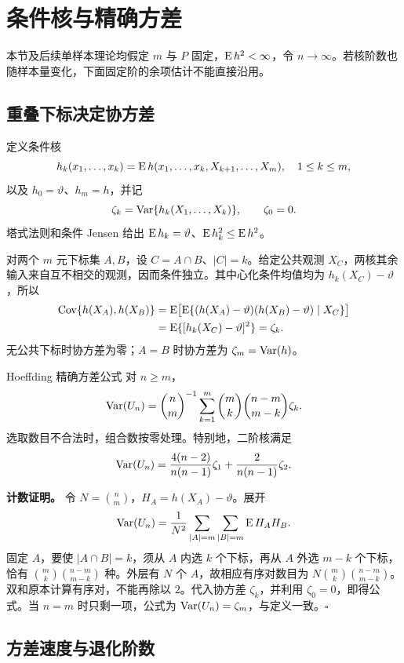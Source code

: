 \section{条件核与精确方差}

本节及后续单样本理论均假定 $m$ 与 $P$ 固定，$\operatorname{E} h^2<\infty$，令 $n\to\infty$。若核阶数也随样本量变化，下面固定阶的余项估计不能直接沿用。

\subsection{重叠下标决定协方差}

定义条件核
\[
 h_k(x_1,\ldots,x_k)
 =\operatorname{E} h(x_1,\ldots,x_k,X_{k+1},\ldots,X_m),
 \quad 1\leq k\leq m,
\]
以及 $h_0=\vartheta$、$h_m=h$，并记
\[
 \zeta_k=\operatorname{Var}\{h_k(X_1,\ldots,X_k)\},\qquad\zeta_0=0.
\]
塔式法则和条件 Jensen 给出 $\operatorname{E} h_k=\vartheta$、$\operatorname{E} h_k^2\leq\operatorname{E} h^2$。

对两个 $m$ 元下标集 $A,B$，设 $C=A\cap B$、$|C|=k$。给定公共观测 $X_C$，两核其余输入来自互不相交的观测，因而条件独立。其中心化条件均值均为 $h_k(X_C)-\vartheta$，所以
\begin{align*}
 \operatorname{Cov}\{h(X_A),h(X_B)\}
 &=\operatorname{E}\bigl[\operatorname{E}\{(h(X_A)-\vartheta)
          (h(X_B)-\vartheta)\mid X_C\}\bigr]\\
 &=\operatorname{E}\{[h_k(X_C)-\vartheta]^2\}=\zeta_k.
\end{align*}
无公共下标时协方差为零；$A=B$ 时协方差为 $\zeta_m=\operatorname{Var}(h)$。

\begin{definitionbox}{Hoeffding 精确方差公式}
对 $n\geq m$，
\begin{equation}
 \operatorname{Var}(U_n)=\binom nm^{-1}
 \sum_{k=1}^m\binom mk\binom{n-m}{m-k}\zeta_k.
 \label{eq:ch4-exact-variance}
\end{equation}
选取数目不合法时，组合数按零处理。特别地，二阶核满足
\[
 \operatorname{Var}(U_n)=\frac{4(n-2)}{n(n-1)}\zeta_1
          +\frac2{n(n-1)}\zeta_2.
\]
\end{definitionbox}

\textbf{计数证明。} 令 $N=\binom nm$，$H_A=h(X_A)-\vartheta$。展开
\[
 \operatorname{Var}(U_n)=\frac1{N^2}\sum_{|A|=m}\sum_{|B|=m}\operatorname{E} H_AH_B.
\]
固定 $A$，要使 $|A\cap B|=k$，须从 $A$ 内选 $k$ 个下标，再从 $A$ 外选 $m-k$ 个下标，恰有 $\binom mk\binom{n-m}{m-k}$ 种。外层有 $N$ 个 $A$，故相应有序对数目为 $N\binom mk\binom{n-m}{m-k}$。双和原本计算有序对，不能再除以 $2$。代入协方差 $\zeta_k$，并利用 $\zeta_0=0$，即得公式。当 $n=m$ 时只剩一项，公式为 $\operatorname{Var}(U_n)=\zeta_m$，与定义一致。\hfill$\square$

\subsection{方差速度与退化阶数}

